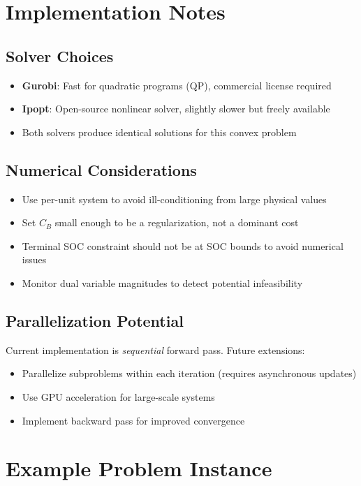 \documentclass[11pt]{article}
\begin{document}
\section{Implementation Notes}

\subsection{Solver Choices}
\begin{itemize}
    \item \textbf{Gurobi}: Fast for quadratic programs (QP), commercial license required
    \item \textbf{Ipopt}: Open-source nonlinear solver, slightly slower but freely available
    \item Both solvers produce identical solutions for this convex problem
\end{itemize}

\subsection{Numerical Considerations}
\begin{itemize}
    \item Use per-unit system to avoid ill-conditioning from large physical values
    \item Set $C_B$ small enough to be a regularization, not a dominant cost
    \item Terminal SOC constraint should not be at SOC bounds to avoid numerical issues
    \item Monitor dual variable magnitudes to detect potential infeasibility
\end{itemize}

\subsection{Parallelization Potential}
Current implementation is \textit{sequential} forward pass. Future extensions:
\begin{itemize}
    \item Parallelize subproblems within each iteration (requires asynchronous updates)
    \item Use GPU acceleration for large-scale systems
    \item Implement backward pass for improved convergence
\end{itemize}

\section{Example Problem Instance}
\end{document}
